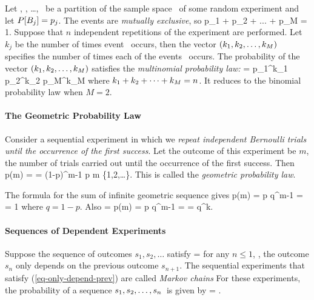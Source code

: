 \bit
	\item Let , , \ldots, \
	be a partition of the sample space \sspace\ of some random experiment
	and let $P[B_j] = p_j$.
	The events are \emph{mutually exclusive}, so
	\beq
		p_1 + p_2 + ... + p_M = 1.
	\eeq
	Suppose that $n$ independent repetitions of the experiment are performed.
	Let $k_j$ be the number of times event \Bi{j}\ occurs,
	then the vector $({k}_1, {k}_2, \ldots, {k}_{M} )$
	specifies the number of times each of the events \ occurs.
	The probability of the vector $({k}_1, {k}_2, \ldots, {k}_{M} )$
	satisfies the \emph{multinomial probability law:}
		 = 
		p_1^{k_1} p_2^{k_2} \cdots p_M^{k_M}
	\eeql
	where ${k}_1 + {k}_2 + \cdots + {k}_{M}  = n$.
	It reduces to the binomial probability law when $M=2$.
\eit

\paragraph{The Geometric Probability Law}

\bit
	\item Consider a sequential experiment
	in which we \emph{repeat independent Bernoulli trials until the occurrence of the first success}.
	Let the outcome of this experiment be $m$,
	the number of trials carried out until the occurrence of the first success.
	Then
		p(m) = 
		= (1-p)^{m-1} p
		\mfor
		m \in \{1,2,\ldots\}.
	\eeql
	This is called the \emph{geometric probability law}.

	\item The formula for the sum of infinite geometric sequence
	gives
	\beq
		 p(m) =  p q^{m-1} =  = 1
	\eeq
	where $q=1-p$.
	Also
	\beq
		=  p(m) =  p q^{m-1}
		=  = q^k.
	\eeq

	\item {}

\eit

\paragraph{Sequences of Dependent Experiments}

\bit
	\item
	Suppose the sequence of outcomes $s_1,s_2,\ldots$ satisfy
		 = 
	\eeql
	for any $n\leq1$,
	\ie,
	the outcome $s_n$ only depends on the previous outcome $s_{n+1}$.
	The sequential experiments that satisfy (\ref{eq-only-depend-prev})
	are called \emph{Markov chains}
	For these experiments, the probability of a sequence
	${s}_1, {s}_2, \ldots, {s}_{n} $\ is given by
		 =  
			\cdots {} .
	\eeql
\eit


